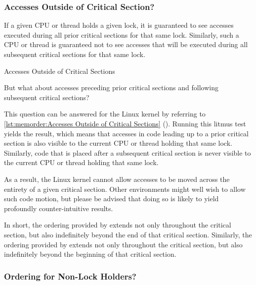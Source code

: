 \subsubsection{Accesses Outside of Critical Section?}
\label{sec:memorder:Accesses Outside of Critical Section?}

If a given CPU or thread holds a given lock, it is guaranteed to see
accesses executed during all prior critical sections for that same
lock.
Similarly, such a CPU or thread is guaranteed not to see accesses
that will be executed during all subsequent critical sections for
that same lock.

\begin{listing}

\caption{Accesses Outside of Critical Sections}
\label{lst:memorder:Accesses Outside of Critical Sections}
\end{listing}

But what about accesses preceding prior critical sections and
following subsequent critical sections?

This question can be answered for the Linux kernel by referring to
\cref{lst:memorder:Accesses Outside of Critical Sections}
().
Running this litmus test yields the  result,
which means that accesses in code leading up to a prior critical section
is also visible to the current CPU or thread holding that same lock.
Similarly, code that is placed after a subsequent critical section
is never visible to the current CPU or thread holding that same lock.

As a result, the Linux kernel cannot allow accesses to be moved
across the entirety of a given critical section.
Other environments might well wish to allow such code motion, but please
be advised that doing so is likely to yield profoundly counter-intuitive
results.

In short, the ordering provided by  extends not only
throughout the critical section, but also indefinitely beyond the end
of that critical section.
Similarly, the ordering provided by  extends not
only throughout the critical section, but also indefinitely beyond the
beginning of that critical section.

\subsubsection{Ordering for Non-Lock Holders?}
\label{sec:memorder:Ordering for Non-Lock Holders?}

